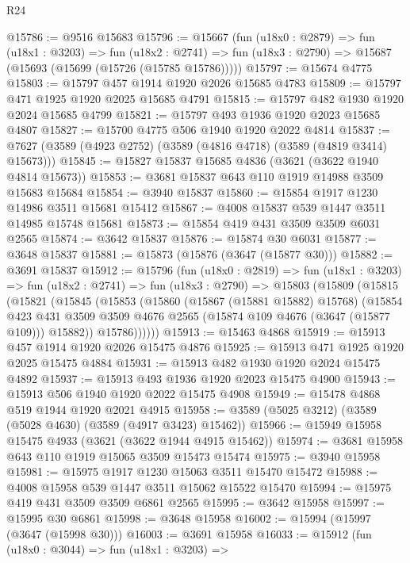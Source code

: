 \begin{lexlean}{R24}
\begin{coremodule}
@15786 := @9516 @15683
@15796 := @15667
    (fun (u18x0 : @2879) =>
    fun (u18x1 : @3203) =>
    fun (u18x2 : @2741) => fun (u18x3 : @2790) => @15687 (@15693 (@15699 (@15726 (@15785 @15786)))))
@15797 := @15674 @4775
@15803 := @15797 @457 @1914 @1920 @2026 @15685 @4783
@15809 := @15797 @471 @1925 @1920 @2025 @15685 @4791
@15815 := @15797 @482 @1930 @1920 @2024 @15685 @4799
@15821 := @15797 @493 @1936 @1920 @2023 @15685 @4807
@15827 := @15700 @4775 @506 @1940 @1920 @2022 @4814
@15837 := @7627 (@3589 (@4923 @2752) (@3589 (@4816 @4718) (@3589 (@4819 @3414) @15673)))
@15845 := @15827 @15837 @15685 @4836 (@3621 (@3622 @1940 @4814 @15673))
@15853 := @3681 @15837 @643 @110 @1919 @14988 @3509 @15683 @15684
@15854 := @3940 @15837
@15860 := @15854 @1917 @1230 @14986 @3511 @15681 @15412
@15867 := @4008 @15837 @539 @1447 @3511 @14985 @15748 @15681
@15873 := @15854 @419 @431 @3509 @3509 @6031 @2565
@15874 := @3642 @15837
@15876 := @15874 @30 @6031
@15877 := @3648 @15837
@15881 := @15873 (@15876 (@3647 (@15877 @30)))
@15882 := @3691 @15837
@15912 := @15796
    (fun (u18x0 : @2819) =>
    fun (u18x1 : @3203) =>
    fun (u18x2 : @2741) =>
    fun (u18x3 : @2790) =>
    @15803
      (@15809
        (@15815
          (@15821
            (@15845
              (@15853
                (@15860
                  (@15867 (@15881 @15882) @15768)
                  (@15854
                    @423
                    @431
                    @3509
                    @3509
                    @4676
                    @2565
                    (@15874 @109 @4676 (@3647 (@15877 @109)))
                    @15882))
                @15786))))))
@15913 := @15463 @4868
@15919 := @15913 @457 @1914 @1920 @2026 @15475 @4876
@15925 := @15913 @471 @1925 @1920 @2025 @15475 @4884
@15931 := @15913 @482 @1930 @1920 @2024 @15475 @4892
@15937 := @15913 @493 @1936 @1920 @2023 @15475 @4900
@15943 := @15913 @506 @1940 @1920 @2022 @15475 @4908
@15949 := @15478 @4868 @519 @1944 @1920 @2021 @4915
@15958 := @3589 (@5025 @3212) (@3589 (@5028 @4630) (@3589 (@4917 @3423) @15462))
@15966 := @15949 @15958 @15475 @4933 (@3621 (@3622 @1944 @4915 @15462))
@15974 := @3681 @15958 @643 @110 @1919 @15065 @3509 @15473 @15474
@15975 := @3940 @15958
@15981 := @15975 @1917 @1230 @15063 @3511 @15470 @15472
@15988 := @4008 @15958 @539 @1447 @3511 @15062 @15522 @15470
@15994 := @15975 @419 @431 @3509 @3509 @6861 @2565
@15995 := @3642 @15958
@15997 := @15995 @30 @6861
@15998 := @3648 @15958
@16002 := @15994 (@15997 (@3647 (@15998 @30)))
@16003 := @3691 @15958
@16033 := @15912
    (fun (u18x0 : @3044) =>
    fun (u18x1 : @3203) =>

\end{coremodule}
\end{lexlean}
